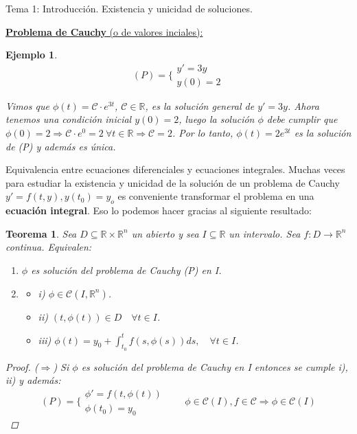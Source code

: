 \documentclass{article}
\newtheorem{theorem}{Teorema}[section]
\newtheorem{example}{Ejemplo}[section]
\begin{document}
\begin{section}{Tema 1: Introducción. Existencia y unicidad de soluciones.}
\begin{subsection}{\underline{\textbf{Problema de Cauchy} (o de valores inciales):}}
        \begin{example}
            \[(P) = \biggl\{ 
                \begin{array}{c}
                y' = 3y \\
                y(0) = 2
                \end{array}
            \]

            Vimos que $\phi(t) = \mathcal{C}\cdot e^{3t}$, $\mathcal{C}\in \mathbb{R}$, es la solución general de $y'=3y$. Ahora tenemos una condición
            inicial $y(0)=2$, luego la solución $\phi$ debe cumplir que $\phi(0) = 2\Rightarrow \mathcal{C}\cdot e^0 = 2 \ \forall t\in \mathbb{R} \Rightarrow \mathcal{C}=2$.
            Por lo tanto, $\phi(t)=2e^{3t}$ es la solución de (P) y además es única.
        \end{example}

        \begin{subsection}{Equivalencia entre ecuaciones diferenciales y ecuaciones integrales.}
            Muchas veces para estudiar la existencia y unicidad de la solución de un problema de Cauchy ${y'=f(t,y), y(t_0)=y_o}$ es conveniente transformar el problema en una 
            \textbf{ecuación integral}. Eso lo podemos hacer gracias al siguiente resultado:

            \begin{theorem}
                Sea $D\subseteq \mathbb{R}\times\mathbb{R}^n$ un abierto y sea $I\subseteq\mathbb{R}$ un intervalo. Sea $f:D\longrightarrow\mathbb{R}^n$ continua. Equivalen:
                \begin{enumerate}
                    \item $\phi$ es solución del problema de Cauchy (P) en I.
                    \item \begin{itemize}
                        \item i) $\phi \in \mathcal{C}(I, \mathbb{R}^n)$.
                        \item ii) $(t, \phi(t))\in D \quad \forall t\in I$.
                        \item iii) $\phi(t) = y_0 + \int_{t_0}^{t}f(s,\phi(s))ds, \quad \forall t \in I$.
                    \end{itemize}
                \end{enumerate}

                \begin{proof}
                ($\mathbf{\Longrightarrow }$) Si $\phi$ es solución del problema de Cauchy en I entonces se cumple i), ii) y además:
                \[(P) = \biggl\{ 
                    \begin{array}{c}
                    \phi' = f(t,\phi(t)) \\
                    \phi(t_0) = y_0
                    \end{array}
                \qquad \phi\in \mathcal{C}(I), f\in\mathcal{C}\Rightarrow\phi\in\mathcal{C}(I)\]


\end{proof}
\end{theorem}
\end{subsection}
\end{subsection}
\end{section}
\end{document}
